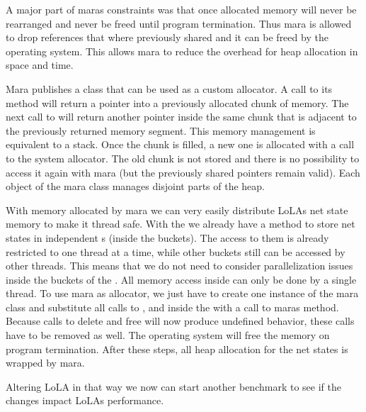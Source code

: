 A major part of maras constraints was that once allocated memory will never be rearranged and never be freed until program termination. Thus mara is allowed to drop references that where previously shared and it can be freed by the operating system. This allows mara to reduce the overhead for heap allocation in space and time.

Mara publishes a class that can be used as a custom allocator. A call to its  method will return a pointer into a previously allocated chunk of memory. The next call to  will return another pointer inside the same chunk that is adjacent to the previously returned memory segment. This memory management is equivalent to a stack. Once the chunk is filled, a new one is allocated with a call to the system allocator. The old chunk is not stored and there is no possibility to access it again with mara (but the previously shared pointers remain valid). Each object of the mara class manages disjoint parts of the heap.

With memory allocated by mara we can very easily distribute LoLAs net state memory to make it thread safe. With the  we already have a method to store net states in independent s (inside the buckets). The access to them is already restricted to one thread at a time, while other buckets still can be accessed by other threads. This means that we do not need to consider parallelization issues inside the buckets of the . All memory access inside can only be done by a single thread. To use mara as allocator, we just have to create one instance of the mara class and substitute all calls to ,  and  inside the  with a call to maras  method. Because calls to delete and free will now produce undefined behavior, these calls have to be removed as well. The operating system will free the memory on program termination. After these steps, all heap allocation for the net states is wrapped by mara. 

Altering LoLA in that way we now can start another benchmark to see if the changes impact LoLAs performance. 

